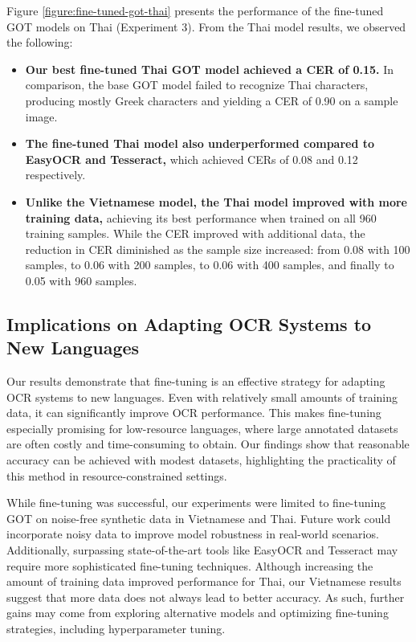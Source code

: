 \documentclass[12pt,oneside]{memoir}
\begin{document}
Figure \ref{figure:fine-tuned-got-thai} presents the performance of the fine-tuned GOT models on Thai (Experiment 3). From the Thai model results, we observed the following:

\begin{itemize}
    \item \textbf{Our best fine-tuned Thai GOT model achieved a CER of 0.15.}
    In comparison, the base GOT model failed to recognize Thai characters, producing mostly Greek characters and yielding a CER of 0.90 on a sample image.
    \item \textbf{The fine-tuned Thai model also underperformed compared to EasyOCR and Tesseract,} which achieved CERs of 0.08 and 0.12 respectively.
    \item \textbf{Unlike the Vietnamese model, the Thai model improved with more training data,} achieving its best performance when trained on all 960 training samples. While the CER improved with additional data, the reduction in CER diminished as the sample size increased: from 0.08 with 100 samples, to 0.06 with 200 samples, to 0.06 with 400 samples, and finally to 0.05 with 960 samples.
\end{itemize}

\subsection{Implications on Adapting OCR Systems to New Languages}

Our results demonstrate that fine-tuning is an effective strategy for adapting OCR systems to new languages.
Even with relatively small amounts of training data, it can significantly improve OCR performance.
This makes fine-tuning especially promising for low-resource languages, where large annotated datasets are often costly and time-consuming to obtain.
Our findings show that reasonable accuracy can be achieved with modest datasets, highlighting the practicality of this method in resource-constrained settings.

While fine-tuning was successful, our experiments were limited to fine-tuning GOT on noise-free synthetic data in Vietnamese and Thai. 
Future work could incorporate noisy data to improve model robustness in real-world scenarios.
Additionally, surpassing state-of-the-art tools like EasyOCR and Tesseract may require more sophisticated fine-tuning techniques. 
Although increasing the amount of training data improved performance for Thai, our Vietnamese results suggest that more data does not always lead to better accuracy. 
As such, further gains may come from exploring alternative models and optimizing fine-tuning strategies, including hyperparameter tuning.
\end{document}
